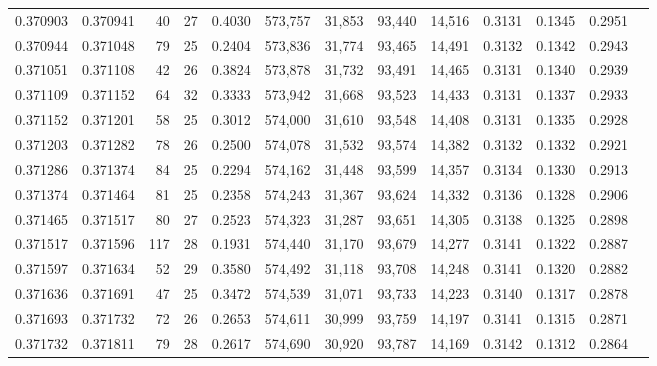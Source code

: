 \begin{tabular}{rrrrrrrrrrrrr}
0.370903 & 0.370941 &    40 &  27 &                                     0.4030 & 573,757 &  31,853 &  93,440 &  14,516 & 0.3131 & 0.1345 & 0.2951 \\
0.370944 & 0.371048 &    79 &  25 &                                     0.2404 & 573,836 &  31,774 &  93,465 &  14,491 & 0.3132 & 0.1342 & 0.2943 \\
0.371051 & 0.371108 &    42 &  26 &                                     0.3824 & 573,878 &  31,732 &  93,491 &  14,465 & 0.3131 & 0.1340 & 0.2939 \\
0.371109 & 0.371152 &    64 &  32 &                                     0.3333 & 573,942 &  31,668 &  93,523 &  14,433 & 0.3131 & 0.1337 & 0.2933 \\
0.371152 & 0.371201 &    58 &  25 &                                     0.3012 & 574,000 &  31,610 &  93,548 &  14,408 & 0.3131 & 0.1335 & 0.2928 \\
0.371203 & 0.371282 &    78 &  26 &                                     0.2500 & 574,078 &  31,532 &  93,574 &  14,382 & 0.3132 & 0.1332 & 0.2921 \\
0.371286 & 0.371374 &    84 &  25 &                                     0.2294 & 574,162 &  31,448 &  93,599 &  14,357 & 0.3134 & 0.1330 & 0.2913 \\
0.371374 & 0.371464 &    81 &  25 &                                     0.2358 & 574,243 &  31,367 &  93,624 &  14,332 & 0.3136 & 0.1328 & 0.2906 \\
0.371465 & 0.371517 &    80 &  27 &                                     0.2523 & 574,323 &  31,287 &  93,651 &  14,305 & 0.3138 & 0.1325 & 0.2898 \\
0.371517 & 0.371596 &   117 &  28 &                                     0.1931 & 574,440 &  31,170 &  93,679 &  14,277 & 0.3141 & 0.1322 & 0.2887 \\
0.371597 & 0.371634 &    52 &  29 &                                     0.3580 & 574,492 &  31,118 &  93,708 &  14,248 & 0.3141 & 0.1320 & 0.2882 \\
0.371636 & 0.371691 &    47 &  25 &                                     0.3472 & 574,539 &  31,071 &  93,733 &  14,223 & 0.3140 & 0.1317 & 0.2878 \\
0.371693 & 0.371732 &    72 &  26 &                                     0.2653 & 574,611 &  30,999 &  93,759 &  14,197 & 0.3141 & 0.1315 & 0.2871 \\
0.371732 & 0.371811 &    79 &  28 &                                     0.2617 & 574,690 &  30,920 &  93,787 &  14,169 & 0.3142 & 0.1312 & 0.2864 \\

\end{tabular}
